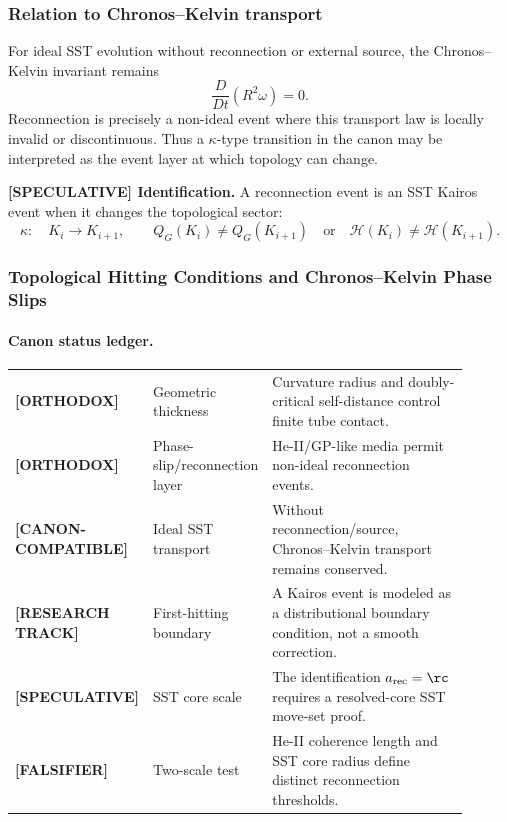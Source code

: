 \subsubsection{Relation to Chronos--Kelvin transport}
For ideal SST evolution without reconnection or external source, the Chronos--Kelvin invariant remains
\begin{equation}
    \frac{D}{Dt}\left(R^2\omega\right)=0.
\end{equation}
Reconnection is precisely a non-ideal event where this transport law is locally invalid or discontinuous. Thus a $\kappa$-type transition in the canon may be interpreted as the event layer at which topology can change.

\textbf{[SPECULATIVE] Identification.}
A reconnection event is an SST Kairos event when it changes the topological sector:
\begin{equation}
    \kappa:\quad K_i\rightarrow K_{i+1},
    \qquad
    Q_G(K_i)\neq Q_G(K_{i+1})
    \quad\text{or}\quad
    \mathcal H(K_i)\neq \mathcal H(K_{i+1}).
\end{equation}

\subsubsection{Topological Hitting Conditions and Chronos--Kelvin Phase Slips}
\label{subsubsec:chronos_kelvin_hitting_conditions}

\paragraph{Canon status ledger.}
\begin{center}
\small
\begin{tabular}{p{0.18\linewidth}p{0.24\linewidth}p{0.48\linewidth}}
\textbf{[ORTHODOX]} & Geometric thickness & Curvature radius and doubly-critical self-distance control finite tube contact.\\
\textbf{[ORTHODOX]} & Phase-slip/reconnection layer & He-II/GP-like media permit non-ideal reconnection events.\\
\textbf{[CANON-COMPATIBLE]} & Ideal SST transport & Without reconnection/source, Chronos--Kelvin transport remains conserved.\\
\textbf{[RESEARCH TRACK]} & First-hitting boundary & A Kairos event is modeled as a distributional boundary condition, not a smooth correction.\\
\textbf{[SPECULATIVE]} & SST core scale & The identification $a_{\rm rec}=\rc$ requires a resolved-core SST move-set proof.\\
\textbf{[FALSIFIER]} & Two-scale test & He-II coherence length and SST core radius define distinct reconnection thresholds.
\end{tabular}
\end{center}


